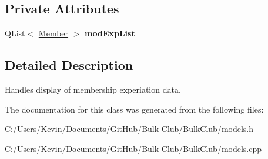 \subsection*{Private Attributes}
\begin{DoxyCompactItemize}
\item 
\mbox{\label{class_exp_model_abedf8e76f37be968e7e7d195b6cb90ac}} 
Q\+List$<$ \mbox{\hyperlink{class_member}{Member}} $>$ {\bfseries mod\+Exp\+List}
\end{DoxyCompactItemize}


\subsection{Detailed Description}
Handles display of membership experiation data. 

The documentation for this class was generated from the following files\+:\begin{DoxyCompactItemize}
\item 
C\+:/\+Users/\+Kevin/\+Documents/\+Git\+Hub/\+Bulk-\/\+Club/\+Bulk\+Club/\mbox{\hyperlink{models_8h}{models.\+h}}\item 
C\+:/\+Users/\+Kevin/\+Documents/\+Git\+Hub/\+Bulk-\/\+Club/\+Bulk\+Club/models.\+cpp\end{DoxyCompactItemize}
